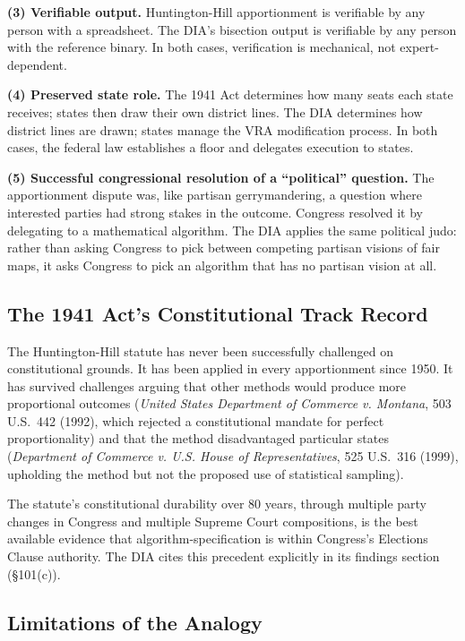 \textbf{(3) Verifiable output.} Huntington-Hill apportionment is verifiable by any person with a spreadsheet. The DIA's bisection output is verifiable by any person with the reference binary. In both cases, verification is mechanical, not expert-dependent.

\textbf{(4) Preserved state role.} The 1941 Act determines how many seats each state receives; states then draw their own district lines. The DIA determines how district lines are drawn; states manage the VRA modification process. In both cases, the federal law establishes a floor and delegates execution to states.

\textbf{(5) Successful congressional resolution of a ``political'' question.} The apportionment dispute was, like partisan gerrymandering, a question where interested parties had strong stakes in the outcome. Congress resolved it by delegating to a mathematical algorithm. The DIA applies the same political judo: rather than asking Congress to pick between competing partisan visions of fair maps, it asks Congress to pick an algorithm that has no partisan vision at all.

\subsection{The 1941 Act's Constitutional Track Record}

The Huntington-Hill statute has never been successfully challenged on constitutional grounds. It has been applied in every apportionment since 1950. It has survived challenges arguing that other methods would produce more proportional outcomes (\textit{United States Department of Commerce v. Montana}, 503 U.S.\ 442 (1992), which rejected a constitutional mandate for perfect proportionality) and that the method disadvantaged particular states (\textit{Department of Commerce v. U.S. House of Representatives}, 525 U.S.\ 316 (1999), upholding the method but not the proposed use of statistical sampling).

The statute's constitutional durability over 80 years, through multiple party changes in Congress and multiple Supreme Court compositions, is the best available evidence that algorithm-specification is within Congress's Elections Clause authority. The DIA cites this precedent explicitly in its findings section (\S101(c)).

\subsection{Limitations of the Analogy}

